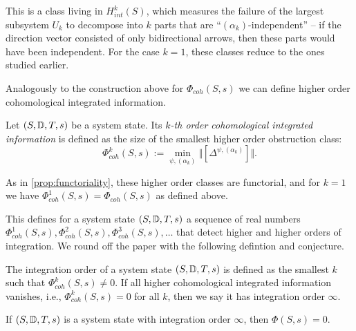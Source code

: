 This is a class living in $H^k_{int}(S)$, which measures the failure of the largest subsystem $U_k$ to decompose into $k$ parts that are ``$(\alpha_k)$-independent'' -- if the direction vector consisted of only bidirectional arrows, then these parts would have been independent. For the case $k=1$, these classes reduce to the ones studied earlier. 

Analogously to the construction above for $\Phi_{coh}(S,s)$ we can define higher order cohomological integrated information. 

\begin{definition}
    Let $(S,\mathbb{D},T,s)$ be a system state. Its \emph{$k$-th order cohomological integrated information} is defined as the size of the smallest higher order obstruction class: 
    \[\Phi_{coh}^k(S,s) := \min_{\psi, (\alpha_k)}\Vert [\Delta^{\psi, (\alpha_k)}]\Vert.\]
\end{definition}

As in \cref{prop:functoriality}, these higher order classes are functorial, and for $k=1$ we have $\Phi^1_{coh}(S,s)=\Phi_{coh}(S,s)$ as defined above. 

This defines for a system state $(S,\mathbb{D},T,s)$ a sequence of real numbers $\Phi^1_{coh}(S,s), \Phi^2_{coh}(S,s), \Phi^3_{coh}(S,s), \ldots$ that detect higher and higher orders of integration. We round off the paper with the following defintion and conjecture.  

\begin{definition}
    The integration order of a system state $(S,\mathbb{D},T,s)$ is defined as the smallest $k$ such that $\Phi_{coh}^k(S,s)\neq 0$. If all higher cohomological integrated information vanishes, i.e., $\Phi_{coh}^k(S,s)=0$ for all $k$, then we say it has integration order $\infty$.  
\end{definition}

\begin{conjecture}
    If $(S,\mathbb{D},T,s)$ is a system state with integration order $\infty$, then $\Phi(S,s)=0$. 
\end{conjecture}

